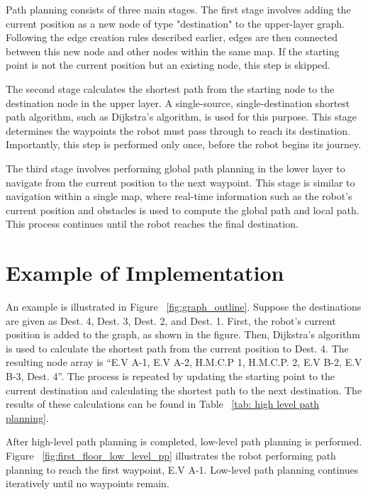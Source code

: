 \documentclass[en]{snu-cse-bsc-thesis}
\begin{document}
Path planning consists of three main stages. The first stage involves adding the current position as a new node of type "destination" to the upper-layer graph. Following the edge creation rules described earlier, edges are then connected between this new node and other nodes within the same map. If the starting point is not the current position but an existing node, this step is skipped.

The second stage calculates the shortest path from the starting node to the destination node in the upper layer. A single-source, single-destination shortest path algorithm, such as Dijkstra’s algorithm, is used for this purpose. This stage determines the waypoints the robot must pass through to reach its destination. Importantly, this step is performed only once, before the robot begins its journey.

The third stage involves performing global path planning in the lower layer to navigate from the current position to the next waypoint. This stage is similar to navigation within a single map, where real-time information such as the robot's current position and obstacles is used to compute the global path and local path. This process continues until the robot reaches the final destination.

\section{Example of Implementation}\label{sec:Example}
An example is illustrated in Figure ~\ref{fig:graph_outline}. Suppose the destinations are given as Dest. 4, Dest. 3, Dest. 2, and Dest. 1. First, the robot's current position is added to the graph, as shown in the figure. Then, Dijkstra’s algorithm is used to calculate the shortest path from the current position to Dest. 4. The resulting node array is “E.V A-1, E.V A-2, H.M.C.P 1, H.M.C.P. 2, E.V B-2, E.V B-3, Dest. 4”. The process is repeated by updating the starting point to the current destination and calculating the shortest path to the next destination. The results of these calculations can be found in Table ~\ref{tab: high level path planning}.

After high-level path planning is completed, low-level path planning is performed. Figure ~\ref{fig:first_floor_low_level_pp} illustrates the robot performing path planning to reach the first waypoint, E.V A-1. Low-level path planning continues iteratively until no waypoints remain.
\end{document}
